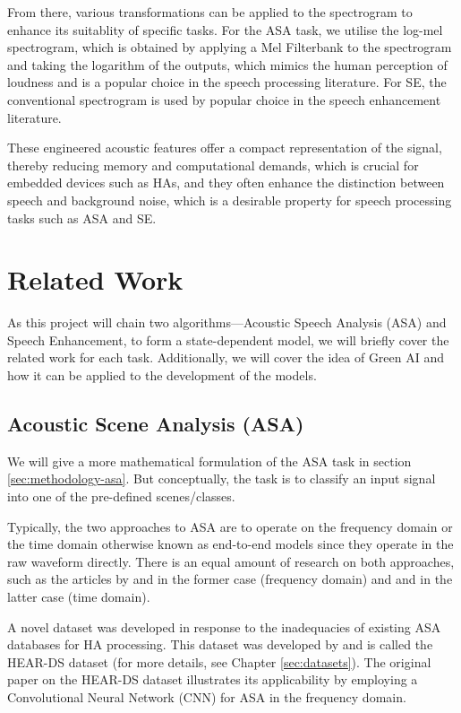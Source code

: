 \documentclass[logo,bsc,singlespacing,parskip,online]{infthesis}
\begin{document}
From there, various transformations can be applied to the spectrogram 
to enhance its suitablity of specific tasks. For the ASA task, we utilise the 
log-mel spectrogram, which is obtained by applying a Mel Filterbank to the spectrogram 
and taking the logarithm of the outputs, which mimics the human perception 
of loudness and is a popular choice in the speech processing literature. 
For SE, the conventional spectrogram is used by popular choice in the speech enhancement literature.

These engineered acoustic features offer a compact representation of the signal, thereby 
reducing memory and computational demands, which is crucial for embedded devices such as 
HAs, and they often enhance the distinction between speech and background noise, 
which is a desirable property for speech processing tasks such as ASA and SE.
\section{Related Work}
As this project will chain two algorithms—Acoustic Speech Analysis (ASA) and Speech Enhancement, 
to form a state-dependent model, we will briefly cover the related work for each task.
Additionally, we will cover the idea of Green AI and how it can be applied to the development of the models.

\subsection{Acoustic Scene Analysis (ASA)}
We will give a more mathematical formulation of the ASA task in section \ref{sec:methodology-asa}. 
But conceptually, the task is to classify an input signal into one of the pre-defined scenes/classes.

Typically, the two approaches to ASA are to  
operate on the frequency domain or the time domain otherwise known as end-to-end models 
since they operate in the raw waveform directly. 
There is an equal amount of research on both approaches, 
such as the articles by \citet{schindler_multi-temporal_2018} and \citet{kim_specmix_2021} 
in the former case (frequency domain) and \citet{dai_very_2016} 
and \citet{kumar_end_2020} in the latter case (time domain).

A novel dataset was developed in response to the inadequacies of existing ASA databases for HA processing. 
This dataset was developed by \citet{Huwel2020HearDS} and is called the HEAR-DS dataset (for more details, see Chapter \ref{sec:datasets}).
The original paper on the HEAR-DS dataset illustrates its applicability by employing a Convolutional Neural Network (CNN) for ASA 
in the frequency domain. 
\end{document}
